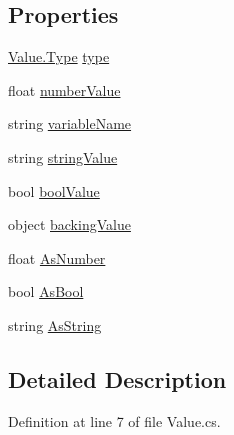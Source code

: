 \subsection*{Properties}
\begin{DoxyCompactItemize}
\item 
\hyperlink{a00181_ad5aaf60ee4504608fcc2ffadefa14884}{Value.\-Type} \hyperlink{a00181_a6d5820fafa766911b9da84d1ed33e51a}{type}
\item 
float \hyperlink{a00181_ae1892c1c7a8177537d1caa39a2e51da6}{number\-Value}
\item 
string \hyperlink{a00181_a8ee2b09b7d28eaf97bf63c74d0023bfd}{variable\-Name}
\item 
string \hyperlink{a00181_add1b07146f1a9e4b655b33c93d07dff9}{string\-Value}
\item 
bool \hyperlink{a00181_acb140e3466e132528409d4c441fd67da}{bool\-Value}
\item 
object \hyperlink{a00181_a051dd30c6cb184f1fe941a95be8781ab}{backing\-Value}
\item 
float \hyperlink{a00181_a751419743761562bf902246d6e6a3c0a}{As\-Number}
\item 
bool \hyperlink{a00181_a5805faef3b3d376090ff096d6dd6c064}{As\-Bool}
\item 
string \hyperlink{a00181_a2d5d0ec41c50c642c1d0eeeb6bb2b1c0}{As\-String}
\end{DoxyCompactItemize}


\subsection{Detailed Description}


Definition at line 7 of file Value.\-cs.



